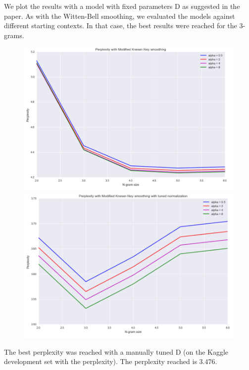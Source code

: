 \documentclass[11pt]{article}
\begin{document}
We plot the results with a model with fixed parameters D as suggested in the paper. As with the Witten-Bell smoothing, we evaluated the models against different starting contexts. In that case, the best results were reached for the 3-grams.

\begin{figure}[H]
  \centering
  \begin{minipage}[b]{0.45\textwidth}
    \includegraphics[width=\textwidth]{perp_mkn}
  \end{minipage}
  \hfill
  \begin{minipage}[b]{0.45\textwidth}
    \includegraphics[width=\textwidth]{perp_mkn_norm}
  \end{minipage}
\end{figure}


The best perplexity was reached with a manually tuned D (on the Kaggle development set with the perplexity). The perplexity reached is $3.476$.
\end{document}
